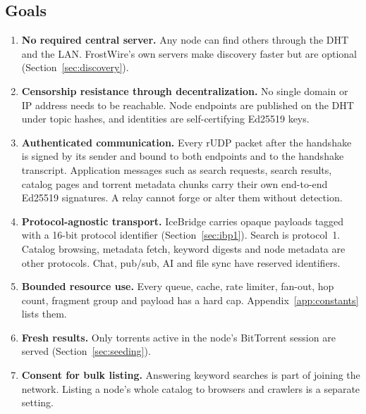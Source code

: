 \documentclass[11pt,a4paper]{article}
\DeclareRobustCommand{\_}{\origunderscore\allowbreak}
\begin{document}
\subsection{Goals}
\begin{enumerate}
\item \textbf{No required central server.} Any node can find others through the DHT and
  the LAN. FrostWire's own servers make discovery faster but are optional (Section~\ref{sec:discovery}).
\item \textbf{Censorship resistance through decentralization.} No single domain or IP
  address needs to be reachable. Node endpoints are published on the DHT under topic hashes,
  and identities are self-certifying Ed25519 keys.
\item \textbf{Authenticated communication.} Every rUDP packet after the handshake is signed
  by its sender and bound to both endpoints and to the handshake transcript. Application
  messages such as search requests, search results, catalog pages and torrent metadata
  chunks carry their own end-to-end Ed25519 signatures. A relay cannot forge or alter them
  without detection.
\item \textbf{Protocol-agnostic transport.} IceBridge carries opaque payloads tagged with a
  16-bit protocol identifier (Section~\ref{sec:ibp1}). Search is protocol~1. Catalog browsing,
  metadata fetch, keyword digests and node metadata are other protocols. Chat, pub/sub, AI
  and file sync have reserved identifiers.
\item \textbf{Bounded resource use.} Every queue, cache, rate limiter, fan-out, hop count,
  fragment group and payload has a hard cap. Appendix~\ref{app:constants} lists them.
\item \textbf{Fresh results.} Only torrents active in the node's BitTorrent session are
  served (Section~\ref{sec:seeding}).
\item \textbf{Consent for bulk listing.} Answering keyword searches is part of joining the
  network. Listing a node's whole catalog to browsers and crawlers is a separate setting.
\end{enumerate}
\end{document}
